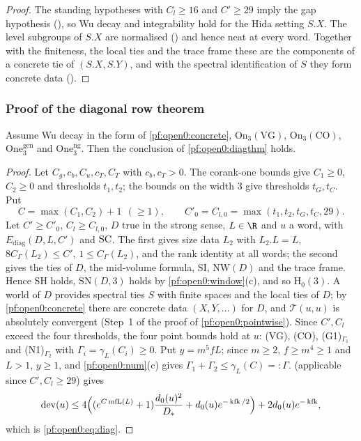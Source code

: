 \begin{proof}
The standing hypotheses with $C_l\ge16$ and $C'\ge29$ imply the gap hypothesis (),
so Wu decay and integrability hold for the Hida setting $S.X$. The level subgroups of $S.X$ are normalised
() and hence neat at every word. Together with the finiteness,
the local ties and the trace frame these are the components of a concrete tie of $(S.X,S.Y)$, and with the spectral
identification of $S$ they form concrete data ().
\end{proof}

\subsubsection{Proof of the diagonal row theorem}

\begin{proposition}\label{pf:open0:reduction}
Assume Wu decay in the form of \cref{pf:open0:concrete}, $\mathrm{On}_3(\mathrm{VG})$, $\mathrm{On}_3(\mathrm{CO})$,
$\mathrm{One}^{\mathrm{gen}}_3$ and $\mathrm{One}^{\mathrm{ng}}_3$. Then the conclusion of \cref{pf:open0:diagthm} holds.
\end{proposition}

\begin{proof}
Let $C_g,c_b,C_u,c_T,C_T$ with
$c_b,c_T>0$. The corank-one bounds give $C_1\ge0$, $C_2\ge0$ and thresholds $t_1,t_2$; the bounds on the width $3$ give
thresholds $t_G,t_C$. Put
\[
C=\max(C_1,C_2)+1\ \ (\ge1),\qquad C'_0=C_{l,0}=\max(t_1,t_2,t_G,t_C,29).
\]
Let $C'\ge C'_0$, $C_l\ge C_{l,0}$, $D$ true in the strong sense, $L\in\R$ and $u$ a word, with $E_{\mathrm{diag}}(D,L,C')$ and
$\mathrm{SC}$. The first gives size data $L_2$ with $L_2.L=L$, $8C_\Gamma(L_2)\le C'$, $1\le C_\Gamma(L_2)$, and the rank identity at all
words; the second gives the ties of $D$, the mid-volume formula, $\mathrm{SI}$, $\mathrm{NW}(D)$ and the trace frame. Hence
$\mathrm{SH}$ holds, $\mathrm{SN}(D,3)$ holds by \cref{pf:open0:window}(c), and so $\mathrm{H}_0(3)$. A world of $D$ provides spectral
ties $S$ with finite spaces and the local ties of $D$; by \cref{pf:open0:concrete} there are concrete data $(X,Y,\dots)$ for $D$, and
$\mathcal T(u,u)$ is absolutely convergent (Step~1 of the proof of \cref{pf:open0:pointwise}). Since $C',C_l$ exceed the four
thresholds, the four point bounds hold at $u$: (VG), (CO), (G1)$_{\Gamma_1}$ and (N1)$_{\Gamma_2}$ with $\Gamma_i=\gamma_L(C_i)\ge0$.
Put $y=m^5fL$; since $m\ge2$, $f\ge m^4\ge1$ and $L>1$, $y\ge1$, and \cref{pf:open0:num}(c) gives $\Gamma_1+\Gamma_2\le\gamma_L(C)=:\Gamma$.
 (applicable since $C',C_l\ge29$) gives
\[
\operatorname{dev}(u)\le4\Bigl((e^{C\operatorname{mfL}(L)}+1)\frac{d_0(u)^2}{D_*}+d_0(u)e^{-\operatorname{kfk}/2}\Bigr)+2d_0(u)e^{-\operatorname{kfk}},
\]
which is \eqref{pf:open0:eq:diag}.
\end{proof}

